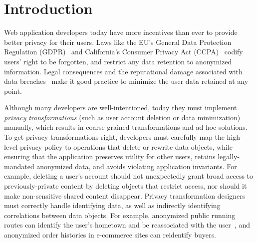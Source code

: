 \section{Introduction}
Web application developers today have more incentives than ever to provide better privacy for their
users.
%
Laws like the EU's General Data Protection Regulation (GDPR)~\cite{eu:gdpr} and California's
Consumer Privacy Act (CCPA)~\cite{ca:privacy-act} codify users' right to be forgotten, and restrict
any data retention to anonymized information.
%
Legal consequences and the reputational damage associated with data breaches~\cite{breach:amazon,
breach:twitter, breach:fb, breach:marriott, breach:quora} make it good practice to minimize the user
data retained at any point.
%

%
Although many developers are well-intentioned, today they must implement \emph{privacy
transformations} (such as user account deletion or data minimization) manually, which results in
coarse-grained transformations and ad-hoc solutions. %
%
To get privacy transformations right, developers must carefully map the high-level privacy
policy to operations that delete or rewrite data objects, while ensuring that the application preserves
utility for other users, retains legally-mandated anonymized data, and avoids violating
application invariants.
%
For example, deleting a user's account should not unexpectedly grant broad
access to previously-private content by deleting objects that restrict access,
nor should it make non-sensitive shared content disappear.
%
%
Privacy transformation designers must correctly handle identifying data, as well as indirectly identifying
correlations between data objects.
%
For example, anonymized public running routes can identify the user's hometown and be
reassociated with the user~\cite{strava:heatmap},
and anonymized order histories in e-commerce sites can reidentify buyers.
%

